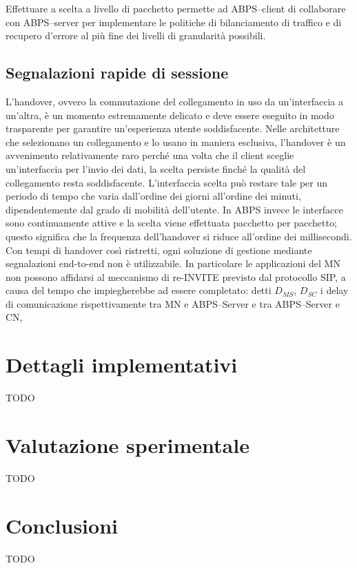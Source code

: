 \documentclass[12pt,a4paper,openright,twoside]{book}
\begin{document}
Effettuare a scelta a livello di pacchetto permette ad ABPS--client di
collaborare con ABPS--server per implementare le politiche di
bilanciamento di traffico e di recupero d'errore al più fine dei
livelli di granularità possibili.

\subsection{Segnalazioni rapide di sessione}
L'handover, ovvero la commutazione del collegamento in uso da
un'interfaccia a un'altra, è un momento estremamente delicato e deve
essere eseguito in modo trasparente per garantire un'esperienza utente
soddisfacente. Nelle architetture che selezionano un collegamento e lo
usano in maniera esclusiva, l'handover è un avvenimento relativamente
raro perché una volta che il client sceglie un'interfaccia per l'invio
dei dati, la scelta persiste finché la qualità del collegamento resta
soddisfacente. L'interfaccia scelta può restare tale per un periodo di
tempo che varia dall'ordine dei giorni all'ordine dei minuti,
dipendentemente dal grado di mobilità dell'utente. In ABPS invece le
interfacce sono continuamente attive e la scelta viene effettuata
pacchetto per pacchetto; questo significa che la frequenza
dell'handover si riduce all'ordine dei millisecondi. Con tempi di
handover così ristretti, ogni soluzione di gestione mediante
segnalazioni end-to-end non è utilizzabile. In particolare le
applicazioni del MN non possono affidarsi al meccanismo di re-INVITE
previsto dal protocollo SIP, a causa del tempo che impiegherebbe ad
essere completato: detti $D_{MS}$, $D_{SC}$ i delay di comunicazione
rispettivamente tra MN e ABPS--Server e tra ABPS--Server e CN,

\section{Dettagli implementativi}

TODO

\section{Valutazione sperimentale}

TODO

\section{Conclusioni}

TODO
\end{document}
